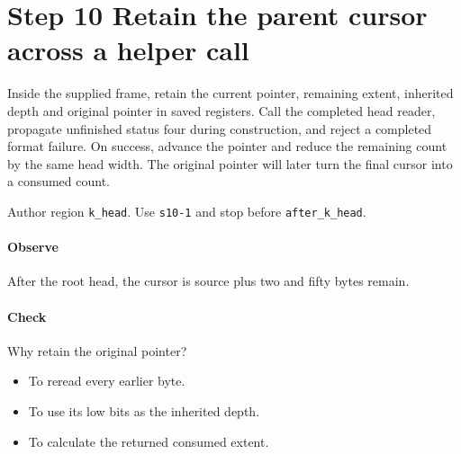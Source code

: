 \section{Step 10 Retain the parent cursor across a helper call}\label{cbor-s10}
Inside the supplied frame, retain the current pointer, remaining extent, inherited depth and original pointer in saved registers. Call the completed head reader, propagate unfinished status four during construction, and reject a completed format failure. On success, advance the pointer and reduce the remaining count by the same head width. The original pointer will later turn the final cursor into a consumed count.

Author region \texttt{k\_head}. Use \texttt{s10-1} and stop before \texttt{after\_k\_head}.

\paragraph{Observe} After the root head, the cursor is source plus two and fifty bytes remain.

\paragraph{Check} Why retain the original pointer?
\begin{itemize}
  \item[A.] To reread every earlier byte.
  \item[B.] To use its low bits as the inherited depth.
  \item[C.] To calculate the returned consumed extent.
\end{itemize}
